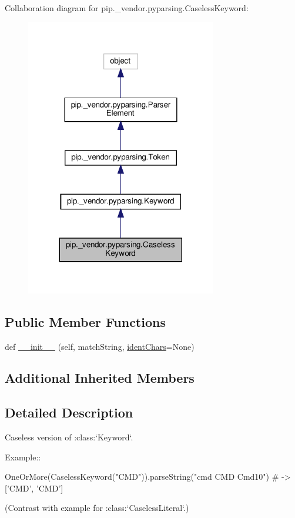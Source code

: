 Collaboration diagram for pip.\+\_\+vendor.\+pyparsing.\+Caseless\+Keyword\+:
\nopagebreak
\begin{figure}[H]
\begin{center}
\leavevmode
\includegraphics[width=236pt]{classpip_1_1__vendor_1_1pyparsing_1_1CaselessKeyword__coll__graph}
\end{center}
\end{figure}
\subsection*{Public Member Functions}
\begin{DoxyCompactItemize}
\item 
def \hyperlink{classpip_1_1__vendor_1_1pyparsing_1_1CaselessKeyword_a44094727a36527cc493647a06f2d3c61}{\+\_\+\+\_\+init\+\_\+\+\_\+} (self, match\+String, \hyperlink{classpip_1_1__vendor_1_1pyparsing_1_1Keyword_a0bad8119f3340e048db399889ffbb756}{ident\+Chars}=None)
\end{DoxyCompactItemize}
\subsection*{Additional Inherited Members}


\subsection{Detailed Description}
\begin{DoxyVerb}Caseless version of :class:`Keyword`.

Example::

    OneOrMore(CaselessKeyword("CMD")).parseString("cmd CMD Cmd10") # -> ['CMD', 'CMD']

(Contrast with example for :class:`CaselessLiteral`.)
\end{DoxyVerb}
 

